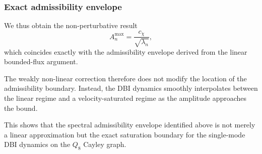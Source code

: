   \subsubsection*{Exact admissibility envelope}

    We thus obtain the non-perturbative result
    \begin{equation}
      A_n^{\max}
      =
      \frac{c_\chi}{\sqrt{\lambda_n}},
    \end{equation}
    which coincides exactly with the admissibility envelope derived from the
    linear bounded-flux argument.

    The weakly non-linear correction therefore does not modify the
    location of the admissibility boundary.
    Instead, the DBI dynamics smoothly interpolates between the linear regime
    and a velocity-saturated regime as the amplitude approaches the bound.

    This shows that the spectral admissibility envelope identified above is not
    merely a linear approximation but the exact saturation boundary for the
    single-mode DBI dynamics on the $Q_8$ Cayley graph.
